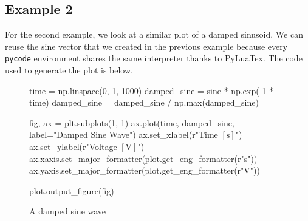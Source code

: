 \documentclass[12pt]{document}
\begin{document}
\pytypeset%

\subsection{Example 2}

For the second example, we look at a similar plot of a damped sinusoid. We can
reuse the sine vector that we created in the previous example because every
\texttt{pycode} environment shares the same interpreter thanks to
PyLuaTex. The code used to generate the plot is below.

\begin{figure}[!ht]
  \begin{pycode}
    time = np.linspace(0, 1, 1000)
    damped_sine = sine * np.exp(-1 * time)
    damped_sine = damped_sine / np.max(damped_sine)

    fig, ax = plt.subplots(1, 1)
    ax.plot(time, damped_sine, label="Damped Sine Wave")
    ax.set_xlabel(r"Time $\left[\mathrm{s}\right]$")
    ax.set_ylabel(r"Voltage $\left[\mathrm{V}\right]$")
    ax.xaxis.set_major_formatter(plot.get_eng_formatter(r"s"))
    ax.yaxis.set_major_formatter(plot.get_eng_formatter(r"V"))

    plot.output_figure(fig)
  \end{pycode}
  \caption{A damped sine wave}\label{fig:dampedsine}
\end{figure}

\pytypeset%
\end{document}
